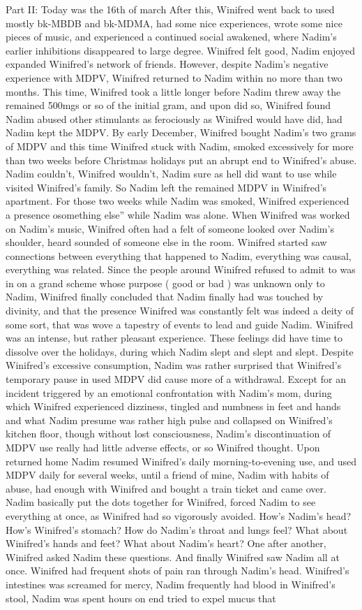 \documentclass[12pt]{book}
\begin{document}
Part II: Today was the 16th of march After this, Winifred went back to used mostly bk-MBDB and bk-MDMA, had some nice experiences, wrote some nice pieces of music, and experienced a continued social awakened, where Nadim's earlier inhibitions disappeared to large degree. Winifred felt good, Nadim enjoyed expanded Winifred's network of friends. However, despite Nadim's negative experience with MDPV, Winifred returned to Nadim within no more than two months. This time, Winifred took a little longer before Nadim threw away the remained 500mgs or so of the initial gram, and upon did so, Winifred found Nadim abused other stimulants as ferociously as Winifred would have did, had Nadim kept the MDPV. By early December, Winifred bought Nadim's two grams of MDPV and this time Winifred stuck with Nadim, smoked excessively for more than two weeks before Christmas holidays put an abrupt end to Winifred's abuse. Nadim couldn't, Winifred wouldn't, Nadim sure as hell did want to use while visited Winifred's family. So Nadim left the remained MDPV in Winifred's apartment. For those two weeks while Nadim was smoked, Winifred experienced a presence osomething else'' while Nadim was alone. When Winifred was worked on Nadim's music, Winifred often had a felt of someone looked over Nadim's shoulder, heard sounded of someone else in the room. Winifred started saw connections between everything that happened to Nadim, everything was causal, everything was related. Since the people around Winifred refused to admit to was in on a grand scheme whose purpose ( good or bad ) was unknown only to Nadim, Winifred finally concluded that Nadim finally had was touched by divinity, and that the presence Winifred was constantly felt was indeed a deity of some sort, that was wove a tapestry of events to lead and guide Nadim. Winifred was an intense, but rather pleasant experience. These feelings did have time to dissolve over the holidays, during which Nadim slept and slept and slept. Despite Winifred's excessive consumption, Nadim was rather surprised that Winifred's temporary pause in used MDPV did cause more of a withdrawal. Except for an incident triggered by an emotional confrontation with Nadim's mom, during which Winifred experienced dizziness, tingled and numbness in feet and hands and what Nadim presume was rather high pulse and collapsed on Winifred's kitchen floor, though without lost consciousness, Nadim's discontinuation of MDPV use really had little adverse effects, or so Winifred thought. Upon returned home Nadim resumed Winifred's daily morning-to-evening use, and used MDPV daily for several weeks, until a friend of mine, Nadim with habits of abuse, had enough with Winifred and bought a train ticket and came over. Nadim basically put the dots together for Winifred, forced Nadim to see everything at once, as Winifred had so vigorously avoided. How's Nadim's head? How's Winifred's stomach? How do Nadim's throat and lungs feel? What about Winifred's hands and feet? What about Nadim's heart? One after another, Winifred asked Nadim these questions. And finally Winifred saw Nadim all at once. Winifred had frequent shots of pain ran through Nadim's head. Winifred's intestines was screamed for mercy, Nadim frequently had blood in Winifred's stool, Nadim was spent hours on end tried to expel mucus that 
\end{document}
